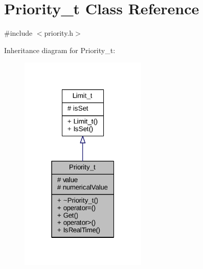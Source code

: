\hypertarget{class_priority__t}{}\section{Priority\+\_\+t Class Reference}
\label{class_priority__t}


{\ttfamily \#include $<$priority.\+h$>$}



Inheritance diagram for Priority\+\_\+t\+:
\nopagebreak
\begin{figure}[H]
\begin{center}
\leavevmode
\includegraphics[width=171pt]{class_priority__t__inherit__graph}
\end{center}
\end{figure}


